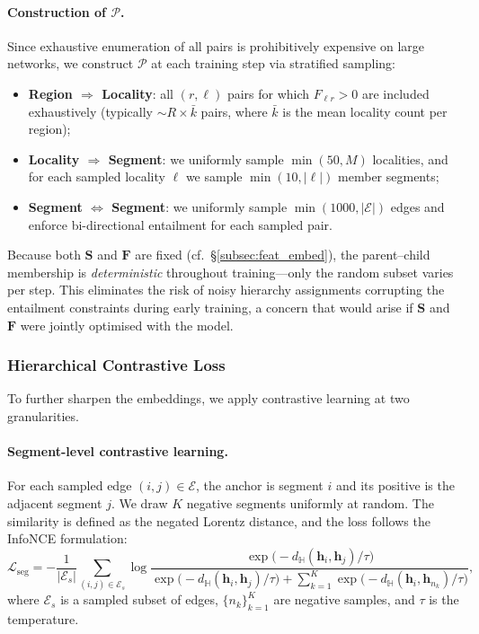 \paragraph{Construction of $\mathcal{P}$.}
Since exhaustive enumeration of all pairs is prohibitively expensive on large networks,
we construct $\mathcal{P}$ at each training step via stratified sampling:
\begin{itemize}[leftmargin=*,itemsep=2pt]
  \item \textbf{Region $\Rightarrow$ Locality}: all $(r, \ell)$ pairs for which $F_{\ell r} > 0$
    are included exhaustively (typically $\sim\!R {\times} \bar{k}$ pairs, where $\bar{k}$ is the mean locality count per region);
  \item \textbf{Locality $\Rightarrow$ Segment}: we uniformly sample $\min(50, M)$ localities,
    and for each sampled locality $\ell$ we sample $\min(10, |\ell|)$ member segments;
  \item \textbf{Segment $\Leftrightarrow$ Segment}: we uniformly sample $\min(1000, |\mathcal{E}|)$ edges
    and enforce bi-directional entailment for each sampled pair.
\end{itemize}
Because both $\mathbf{S}$ and $\mathbf{F}$ are fixed (cf.\ \S\ref{subsec:feat_embed}),
the parent--child membership is \emph{deterministic} throughout training---only the random subset varies per step.
This eliminates the risk of noisy hierarchy assignments corrupting the entailment constraints during early training, a concern that would arise if $\mathbf{S}$ and $\mathbf{F}$ were jointly optimised with the model.

\subsubsection{Hierarchical Contrastive Loss}\label{subsubsec:contrast_loss}

To further sharpen the embeddings, we apply contrastive learning at two granularities.

\paragraph{Segment-level contrastive learning.}
For each sampled edge $(i,j) \in \mathcal{E}$, the anchor is segment $i$ and its positive is the adjacent segment $j$.
We draw $K$ negative segments uniformly at random.
The similarity is defined as the negated Lorentz distance, and the loss follows the InfoNCE formulation:
\begin{equation}\label{eq:loss_seg_cl}
  \mathcal{L}_{\text{seg}}
  = -\frac{1}{|\mathcal{E}_s|}
    \sum_{(i,j) \in \mathcal{E}_s}
    \log \frac{
      \exp\!\bigl(-d_{\mathbb{H}}(\mathbf{h}_i, \mathbf{h}_j) / \tau\bigr)
    }{
      \exp\!\bigl(-d_{\mathbb{H}}(\mathbf{h}_i, \mathbf{h}_j) / \tau\bigr)
      + \sum_{k=1}^{K} \exp\!\bigl(-d_{\mathbb{H}}(\mathbf{h}_i, \mathbf{h}_{n_k}) / \tau\bigr)
    },
\end{equation}
where $\mathcal{E}_s$ is a sampled subset of edges, $\{n_k\}_{k=1}^K$ are negative samples, and $\tau$ is the temperature.

